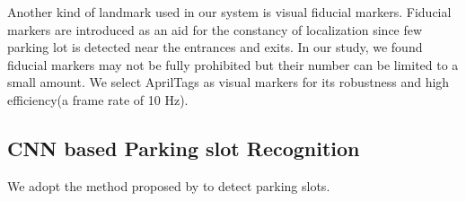\documentclass[journal]{IEEEtran}
\newcommand{\COMMENT}[1]{\textcolor{red}{#1}}
\begin{document}
Another kind of landmark used in our system is visual fiducial markers.
Fiducial markers are introduced as an aid for the constancy of localization since few parking lot is detected near the entrances and exits. 
In our study, we found fiducial markers may not be fully prohibited but their number can be limited to a small amount. 
We select AprilTags as visual markers for its robustness and high efficiency(a frame rate of 10 Hz)\citep{Olson2011AprilTag}.

\subsection{CNN based Parking slot Recognition}
\label{sec:recognition}

We adopt the method proposed by \citep{Li2017Vision} to detect parking slots.
%

\end{document}
